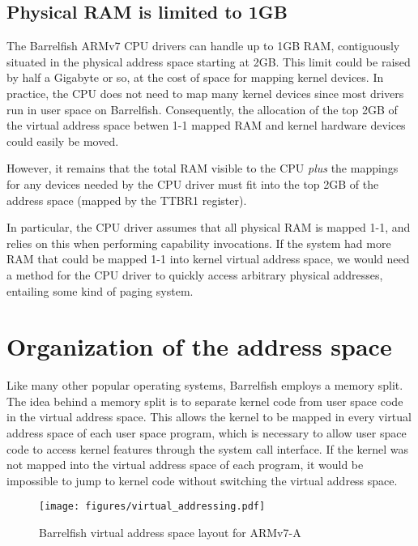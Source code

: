 \documentclass[a4paper,twoside]{report} %
\begin{document}
\section{Physical RAM is limited to 1GB}

The Barrelfish ARMv7 CPU drivers can handle up to 1GB RAM,
contiguously situated in the physical address space starting at 2GB.
This limit could be raised by half a Gigabyte or so, at the cost of
space for mapping kernel devices.  In practice, the CPU does not need
to map many kernel devices since most drivers run in user space on
Barrelfish.   Consequently, the allocation of the top 2GB of the
virtual address space betwen 1-1 mapped RAM and kernel hardware
devices could easily be moved. 

However, it remains that the total RAM visible to the CPU \emph{plus}
the mappings for any devices needed by the CPU driver must fit into
the top 2GB of the address space (mapped by the TTBR1 register).   

In particular, the CPU driver assumes that all physical RAM is mapped
1-1, and relies on this when performing capability invocations.   If
the system had more RAM that could be mapped 1-1 into kernel virtual
address space, we would need a method for the CPU driver to quickly
access arbitrary physical addresses, entailing some kind of paging
system.  


\chapter{Organization of the address space}

Like many other popular operating systems, Barrelfish employs a memory
split. The idea behind a memory split is to separate kernel code from
user space code in the virtual address space. This allows the kernel
to be mapped in every virtual address space of each user space
program, which is necessary to allow user space code to access kernel
features through the system call interface. If the kernel was not
mapped into the virtual address space of each program, it would be
impossible to jump to kernel code without switching the virtual
address space. 

\begin{figure}[htb]
  \centering
  \texttt{[image: figures/virtual\_addressing.pdf]}
  \caption{Barrelfish virtual address space layout for ARMv7-A}
  \label{fig:memory_layout}
\end{figure}
\end{document}
